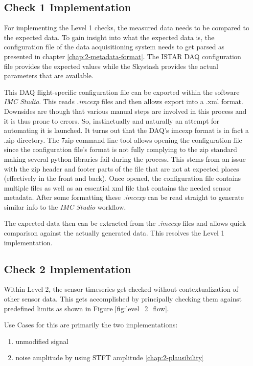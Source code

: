 \subsection{Check 1 Implementation}
\label{chap:4-level1}

For implementing the Level 1 checks, the measured data needs to be compared to the expected data. To gain insight into what the expected data is, the configuration file of the data acquisitioning system needs to get parsed as presented in chapter \ref{chap:2-metadata-format}. The ISTAR DAQ configuration file provides the expected values while the Skystash provides the actual parameters that are available.

This DAQ flight-specific configuration file can be exported within the software \textit{IMC Studio}. This reads \textit{.imcexp} files and then allows export into a .xml format. Downsides are though that various manual steps are involved in this process and it is thus prone to errors. So, instinctually and naturally an attempt for automating it is launched. It turns out that the DAQ's imcexp format is in fact a .zip directory. The 7zip command line tool allows opening the configuration file since the configuration file's format is not fully complying to the zip standard making several python libraries fail during the process. This stems from an issue with the zip header and footer parts of the file that are not at expected places (effectively in the front and back). Once opened, the configuration file contains multiple files as well as an essential xml file that contains the needed sensor metadata. After some formatting these \textit{.imcexp} can be read straight to generate similar info to the \textit{IMC Studio} workflow.

The expected data then can be extracted from the \textit{.imcexp} files and allows quick comparison against the actually generated data. This resolves the Level 1 implementation.

\subsection{Check 2 Implementation}
\label{chap:4-level2}
Within Level 2, the sensor timeseries get checked without contextualization of other sensor data. This gets accomplished by principally checking them against predefined limits as shown in Figure \ref{fig:level_2_flow}.

Use Cases for this are primarily the two implementations:

\begin{enumerate}
    \item unmodified signal
    \item noise amplitude by using STFT amplitude \ref{chap:2-plausibility}
\end{enumerate}

